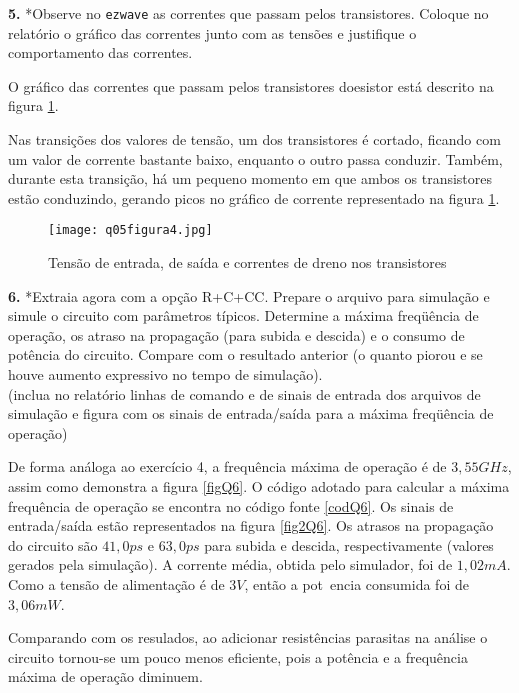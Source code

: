 \documentclass[10pt, a4paper, titlepage]{article}
\begin{document}
\textbf{5.} *Observe no \verb|ezwave| as correntes que passam pelos transistores. Coloque no relatório o gráfico das correntes junto com as tensões e justifique o comportamento das correntes.

O gráfico das correntes que passam pelos transistores doesistor está descrito na figura \ref{figCorrenteQ5}.

Nas transições dos valores de tensão, um dos transistores é cortado, ficando com um valor de corrente bastante baixo, enquanto o outro passa conduzir. Também, durante esta transição, há um pequeno momento em que ambos os transistores estão conduzindo, gerando picos no gráfico de corrente representado na figura \ref{figCorrenteQ5}.

\begin{figure}[!hb]
    \centering
    \texttt{[image: q05figura4.jpg]}
    \caption{Tensão de entrada, de saída e correntes de dreno nos transistores}
    \label{figCorrenteQ5}
\end{figure}

\textbf{6.} *Extraia agora com a opção R+C+CC. Prepare o arquivo para simulação e simule o circuito com parâmetros típicos. Determine a máxima freqüência de operação, os atraso na propagação (para subida e descida) e o consumo de potência do circuito. Compare com o resultado anterior (o quanto piorou e se houve aumento expressivo no tempo de simulação).\\
        (inclua no relatório linhas de comando e de sinais de entrada dos arquivos de simulação e figura com os sinais de entrada\slash saída para a máxima freqüência de operação)

De forma análoga ao exercício 4, a frequência máxima de operação é de $3,55GHz$, assim como demonstra a figura \ref{figQ6}. O código adotado para calcular a máxima frequência de operação se encontra no código fonte \ref{codQ6}. Os sinais de entrada\slash saída estão representados na figura \ref{fig2Q6}. Os atrasos na propagação do circuito são $41,0ps$ e $63,0ps$ para subida e descida, respectivamente (valores gerados pela simulação). A corrente média, obtida pelo simulador, foi de $1,02mA$. Como a tensão de alimentação é de $3V$, então a pot~encia consumida foi de $3,06mW$.

Comparando com os resulados, ao adicionar resistências parasitas na análise o circuito tornou-se um pouco menos eficiente, pois a potência e a frequência máxima de operação diminuem.
\end{document}
